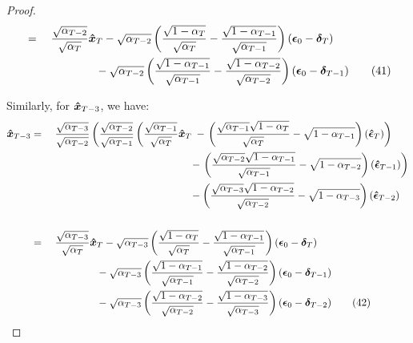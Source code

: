\documentclass{article}
\newtheorem{proof}{Proof}
\begin{document}
\begin{proof}
\begin{alignat}{2}
& = \; &&\frac{\sqrt{\alpha_{T-2}}}{\sqrt{\alpha_{T}}} \boldsymbol{\Hat{x}}_{T} \notag  - { \sqrt{\alpha_{T-2}} \left(\frac{\sqrt{1-\alpha_{T}}}{\sqrt{\alpha_{T}}} - \frac{\sqrt{1-\alpha_{T-1}}}{\sqrt{\alpha_{T-1}}}\right) \left( \boldsymbol{\epsilon}_0 - \boldsymbol{\delta}_T \right)} \notag \\
& && \quad \quad \quad \quad - { \sqrt{\alpha_{T-2}} \left(\frac{\sqrt{1-\alpha_{T-1}}}{\sqrt{\alpha_{T-1}}} - \frac{\sqrt{1-\alpha_{T-2}}}{\sqrt{\alpha_{T-2}}}\right) \left( \boldsymbol{\epsilon}_0 - \boldsymbol{\delta}_{T-1} \right)} \tag{41} \label{apdx_eq:27}
\end{alignat}



Similarly, for $\boldsymbol{\Hat{x}}_{T-3}$, we have:
\begin{alignat}{2}
\boldsymbol{\Hat{x}}_{T-3}  \notag &  = \; && \frac{\sqrt{\alpha_{T-3}}}{\sqrt{\alpha_{T-2}}} \left( \frac{\sqrt{\alpha_{T-2}}}{\sqrt{\alpha_{T-1}}} \left(\frac{\sqrt{\alpha_{T-1}}}{\sqrt{\alpha_{T}}} \boldsymbol{\Hat{x}}_{T} \right. \right. \notag  -  {\left. \left(\frac{\sqrt{\alpha_{T-1}}\sqrt{1-\alpha_{T}}}{\sqrt{\alpha_{T}}} - \sqrt{1-\alpha_{T-1}}\right) \left( \boldsymbol{\Hat{\epsilon}}_T \right)\right)} \notag  \\
& && \quad \quad \quad \quad \quad \quad \quad \quad \quad \quad \quad \quad \quad  - {\left. \left(\frac{\sqrt{\alpha_{T-2}}\sqrt{1-\alpha_{T-1}}}{\sqrt{\alpha_{T-1}}} - \sqrt{1-\alpha_{T-2}}\right) \left( \boldsymbol{\Hat{\epsilon}}_{T-1} \right) \right)} \notag  \\ & && \quad \quad \quad \quad \quad \quad \quad \quad \quad \quad \quad \quad \quad - {\left(\frac{\sqrt{\alpha_{T-3}}\sqrt{1-\alpha_{T-2}}}{\sqrt{\alpha_{T-2}}} - \sqrt{1-\alpha_{T-3}}\right) \left( \boldsymbol{\Hat{\epsilon}}_{T-2} \right)} \notag  \\ \notag \\
& = \; && \frac{\sqrt{\alpha_{T-3}}}{\sqrt{\alpha_{T}}} \boldsymbol{\Hat{x}}_{T}   - {\sqrt{\alpha_{T-3}} \left(\frac{\sqrt{1-\alpha_{T}}}{\sqrt{\alpha_{T}}} - \frac{\sqrt{1-\alpha_{T-1}}}{\sqrt{\alpha_{T-1}}} \right) \left( \boldsymbol{\epsilon}_0 - \boldsymbol{\delta}_T \right)} \notag  \\
& && \quad \quad \quad \quad - {\sqrt{\alpha_{T-3}} \left(\frac{\sqrt{1-\alpha_{T-1}}}{\sqrt{\alpha_{T-1}}} - \frac{\sqrt{1-\alpha_{T-2}}}{\sqrt{\alpha_{T-2}}}\right) \left( \boldsymbol{\epsilon}_0 - \boldsymbol{\delta}_{T-1} \right) } \notag  \\
& && \quad \quad \quad \quad - {\sqrt{\alpha_{T-3}} \left(\frac{\sqrt{1-\alpha_{T-2}}}{\sqrt{\alpha_{T-2}}} - \frac{\sqrt{1-\alpha_{T-3}}}{\sqrt{\alpha_{T-3}}}\right) \left( \boldsymbol{\epsilon}_0 - \boldsymbol{\delta}_{T-2} \right)}  \tag{42} \label{apdx_eq:28}

\end{alignat}
\end{proof}
\end{document}
